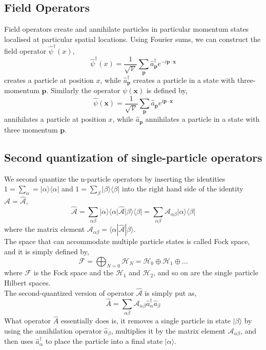 \subsection{Field Operators}
Field operators create and annihilate particles in particular momentum states localised at particular spatial locations. Using Fourier sums, we can construct the field operator $\hat{\psi}^\dagger(x)$,
\begin{equation}
    \hat{\psi}^\dagger(x)=\frac{1}{\sqrt{\mathcal{V}}}\sum_{\textbf{p}}\hat{a}^\dagger_{\textbf{p}}e^{-i\textbf{p}\cdot\textbf{x}}
\end{equation}
creates a particle at position $x$, while $\hat{a}^\dagger_{\textbf{p}}$ creates a particle in a state with three-momentum $\textbf{p}$. Similarly the operator $\psi(\textbf{x})$ is defined by,
\begin{equation}
    \hat{\psi}(\textbf{x})=\frac{1}{\sqrt{\mathcal{V}}}\sum_{\textbf{p}}\hat{a}_{\textbf{p}}e^{i\textbf{p}\cdot\textbf{x}}
\end{equation}
annihilates a particle at position $x$, while $\hat{a}_{\textbf{p}}$ annihilates a particle in a state with three momentum $\textbf{p}$.
\subsection{Second quantization of single-particle operators}
We second quantize the n-particle operators by inserting the identities $1=\sum_\alpha=|\alpha\rangle\langle\alpha|$ and $1=\sum_\beta|\beta\rangle\langle\beta|$ into the right hand side of the identity $\hat{\mathcal{A}}=\hat{\mathcal{A}}$,
\begin{equation}
    \hat{\mathcal{A}}=\sum_{\alpha\beta}|\alpha\rangle\langle\alpha|\hat{\mathcal{A}}|\beta\rangle\langle\beta|=\sum_{\alpha\beta}\mathcal{A}_{\alpha\beta}|\alpha\rangle\langle\beta|
\end{equation}
where the matrix element $\mathcal{A}_{\alpha\beta}=\langle\alpha|\hat{\mathcal{A}}|\beta\rangle$.\\
The space that can accommodate multiple particle states is called Fock space, and it is simply defined by,
\begin{equation}
    \mathcal{F}=\bigoplus_{N=0}\mathcal{H}_N=\mathcal{H}_0\oplus \mathcal{H}_1\oplus...
\end{equation}
where $\mathcal{F}$ is the Fock space and the $\mathcal{H}_1$ and $\mathcal{H}_2$, and so on are the single particle Hilbert spaces.\\
The second-quantized version of operator $\hat{\mathcal{A}}$ is simply put as,
\begin{equation}
    \hat{A}=\sum_{\alpha\beta}\mathcal{A}_{\alpha\beta}\hat{a}^\dagger_\alpha\hat{a}_\beta
\end{equation}
What operator $\hat{A}$ essentially does is, it removes a single particle in state $|\beta\rangle$ by using the annihilation operator $\hat{a}_\beta$, multiplies it by the matrix element $\mathcal{A}_{\alpha\beta}$, and then uses $\hat{a}^\dagger_\alpha$ to place the particle into a final state $|\alpha\rangle$.
